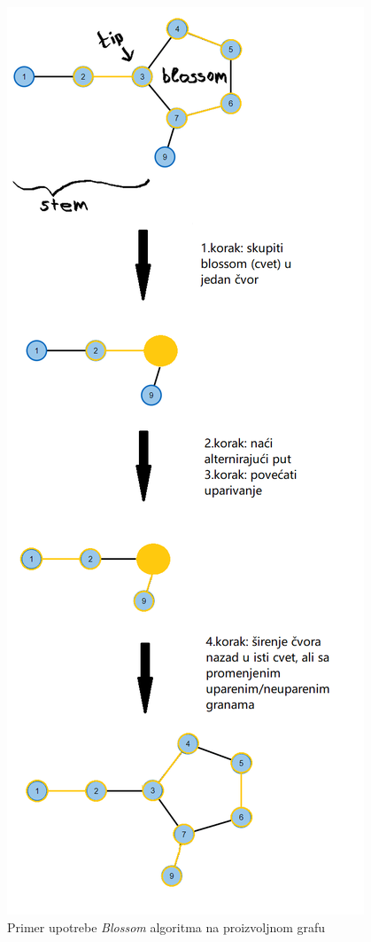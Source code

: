 \documentclass[11pt,a4paper]{article}
\theoremstyle{definition}
\begin{document}
\begin{figure}[H]
\begin{center}
\includegraphics[scale=0.52]{Screenshot (363).png}
\end{center}
\caption{Primer upotrebe \textit{Blossom} algoritma na proizvoljnom grafu}
\label{fig:slika 44}
\end{figure}
\end{document}
